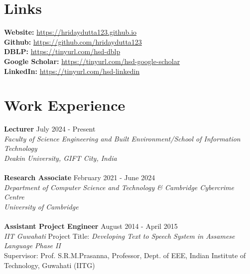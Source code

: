 \documentclass[margin, centered,lmodern]{res}
\begin{document}
\begin{resume}

\section{Links}
\textbf{Website:} \url{https://hridaydutta123.github.io} \\
\textbf{Github:} \url{https://github.com/hridaydutta123} \\
\textbf{DBLP:} \url{https://tinyurl.com/hsd-dblp} \\
\textbf{Google Scholar:} \url{https://tinyurl.com/hsd-google-scholar} \\
\textbf{LinkedIn:} \url{https://tinyurl.com/hsd-linkedin}
\section{Work Experience}
\textbf{Lecturer} \hfill July 2024 - Present\\
\emph{Faculty of Science Engineering and Built Environment/School of Information Technology \\
Deakin University, GIFT City,  India
} \\
\\
\textbf{Research Associate} \hfill February 2021 - June 2024\\
\emph{Department of Computer Science and Technology \& Cambridge Cybercrime Centre \\
University of Cambridge
} \\
\\
\textbf{Assistant Project Engineer} \hfill August 2014 - April 2015 \\
\emph{IIT Guwahati}
Project Title: \textit{Developing Text to Speech System in Assamese Language Phase II} \\
Supervisor: Prof. S.R.M.Prasanna, Professor, Dept. of EEE, Indian Institute of Technology, Guwahati (IITG)




\end{resume}
\end{document}
